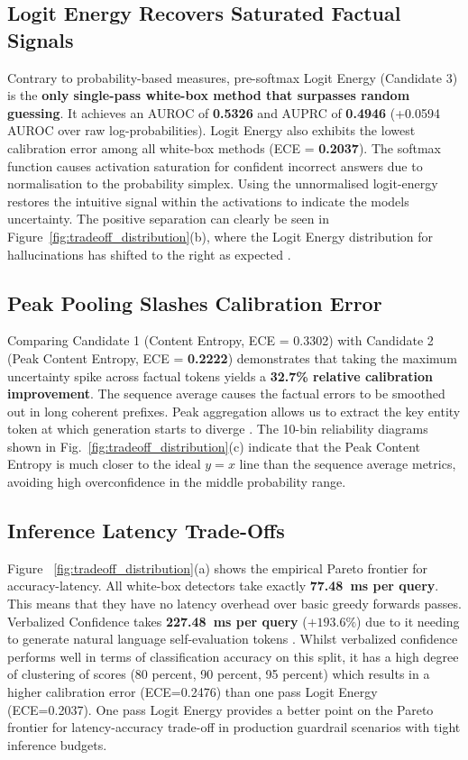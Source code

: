 \documentclass[10pt,twocolumn]{article}
\begin{document}
\subsection{Logit Energy Recovers Saturated Factual Signals}
Contrary to probability-based measures, pre-softmax Logit Energy (Candidate 3) is the \textbf{only single-pass white-box method that surpasses random guessing}. It achieves an AUROC of \textbf{0.5326} and AUPRC of \textbf{0.4946} (+0.0594 AUROC over raw log-probabilities). Logit Energy also exhibits the lowest calibration error among all white-box methods (ECE = \textbf{0.2037}). The softmax function causes activation saturation for confident incorrect answers due to normalisation to the probability simplex. Using the unnormalised logit-energy restores the intuitive signal within the activations to indicate the models uncertainty. The positive separation can clearly be seen in Figure~\ref{fig:tradeoff_distribution}(b), where the Logit Energy distribution for hallucinations has shifted to the right as expected \cite{zhao2024semantic}.

\subsection{Peak Pooling Slashes Calibration Error}
Comparing Candidate 1 (Content Entropy, ECE = 0.3302) with Candidate 2 (Peak Content Entropy, ECE = \textbf{0.2222}) demonstrates that taking the maximum uncertainty spike across factual tokens yields a \textbf{32.7\% relative calibration improvement}. The sequence average causes the factual errors to be smoothed out in long coherent prefixes. Peak aggregation allows us to extract the key entity token at which generation starts to diverge \cite{snyder2024early}. The 10-bin reliability diagrams shown in Fig.~\ref{fig:tradeoff_distribution}(c) indicate that the Peak Content Entropy is much closer to the ideal $y=x$ line than the sequence average metrics, avoiding high overconfidence in the middle probability range.

\subsection{Inference Latency Trade-Offs}
Figure ~\ref{fig:tradeoff_distribution}(a) shows the empirical Pareto frontier for accuracy-latency. All white-box detectors take exactly \textbf{77.48~ms per query}. This means that they have no latency overhead over basic greedy forwards passes. Verbalized Confidence takes \textbf{227.48~ms per query} ($+193.6\%$) due to it needing to generate natural language self-evaluation tokens \cite{lin2022teaching}. Whilst verbalized confidence performs well in terms of classification accuracy on this split, it has a high degree of clustering of scores (80 percent, 90 percent, 95 percent) which results in a higher calibration error (ECE=0.2476) than one pass Logit Energy (ECE=0.2037). One pass Logit Energy provides a better point on the Pareto frontier for latency-accuracy trade-off in production guardrail scenarios with tight inference budgets.
\end{document}
